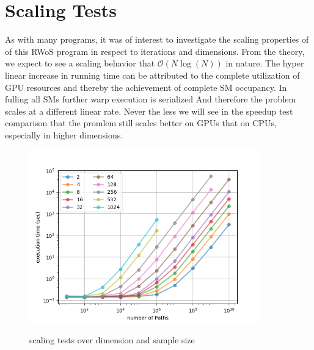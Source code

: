 \section{Scaling Tests}
As with many programs, it was of interest to investigate the scaling properties of
of this \Gls{RWoS} program in respect to iterations and dimensions. From the theory,
we expect to see a scaling behavior that $\mathcal{O}( N\log(N))$ in nature.
The hyper linear increase in running time can be attributed to the complete utilization
of \gls{GPU} resources and thereby the achievement of
complete \gls{SM} occupancy. In fulling all \glspl{SM} further warp execution
is serialized And therefore the problem scales at a different linear rate.  Never the less
we will see in the speedup test comparison that the promlem still scales better on \glspl{GPU}
that on \glspl{CPU}, especially in higher dimensions.
\begin{figure}[hbt!]
\begin{center}
\includegraphics[width=10.0cm]{styles/scaling} \label{plot:scaling}
  \caption{scaling tests over dimension and sample size}
\end{center}
\end{figure}
